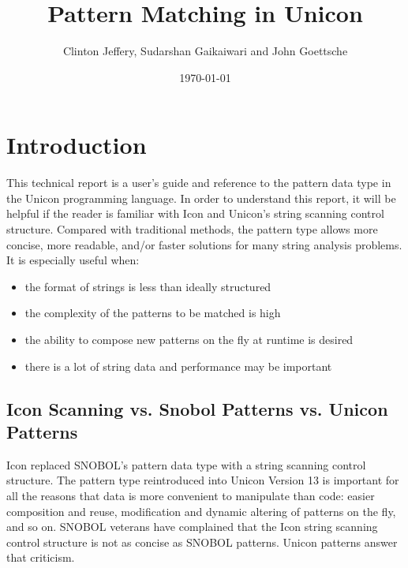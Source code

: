 \documentclass[letterpaper,12pt]{article}
\title{Pattern Matching in Unicon}
\author{Clinton Jeffery, Sudarshan Gaikaiwari and John Goettsche}
\date{\today}
\begin{document}


\maketitle


\section{Introduction}

This technical report is a user's guide and reference to the pattern
data type in the Unicon programming language. In order to understand
this report, it will be helpful if the reader is familiar with Icon
and Unicon's string scanning control structure. Compared with
traditional methods, the pattern type allows more concise, more
readable, and/or faster solutions for many string analysis problems.
It is especially useful when:

\begin{itemize}
\item the format of strings is less than ideally structured
\item the complexity of the patterns to be matched is high
\item the ability to compose new patterns on the fly at runtime is
desired
\item there is a lot of string data and performance may be important
\end{itemize}

\subsection{Icon Scanning vs. Snobol Patterns vs. Unicon Patterns}

Icon replaced SNOBOL's pattern data type with a
string scanning control structure.  The pattern type reintroduced
into Unicon Version 13 is important for all the reasons that data
is more convenient to manipulate than code: easier composition and
reuse, modification and dynamic altering of patterns on the fly, and
so on. SNOBOL veterans have complained that the Icon string
scanning control structure is not as concise as SNOBOL patterns.
Unicon patterns answer that criticism.
\end{document}
